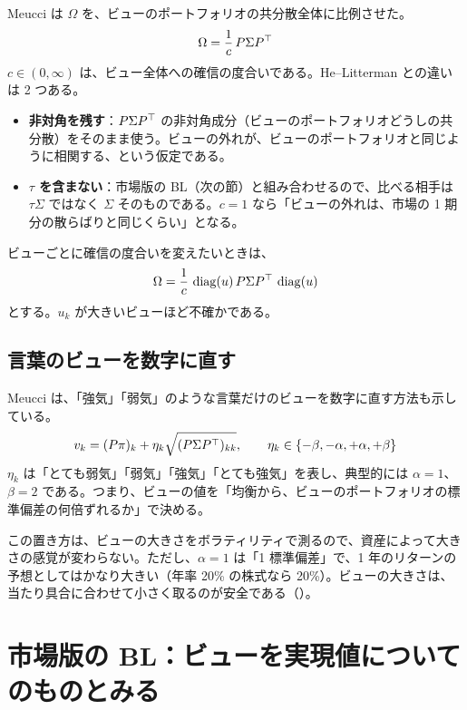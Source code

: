 Meucci は $\Omega$ を、ビューのポートフォリオの共分散全体に比例させた。
\begin{equation}
\Omega=\frac1c\,P\Sigma P^{\top}
\label{eq:meucci-omega}
\end{equation}
$c\in(0,\infty)$ は、ビュー全体への確信の度合いである。He--Litterman との違いは 2 つある。

\begin{itemize}
\item \textbf{非対角を残す}：$P\Sigma P^{\top}$ の非対角成分（ビューのポートフォリオどうしの共分散）をそのまま使う。ビューの外れが、ビューのポートフォリオと同じように相関する、という仮定である。
\item \textbf{$\tau$ を含まない}：市場版の BL（次の節）と組み合わせるので、比べる相手は $\tau\Sigma$ ではなく $\Sigma$ そのものである。$c=1$ なら「ビューの外れは、市場の 1 期分の散らばりと同じくらい」となる。
\end{itemize}

ビューごとに確信の度合いを変えたいときは、
\begin{equation}
\Omega=\frac1c\,\operatorname{diag}(u)\,P\Sigma P^{\top}\,\operatorname{diag}(u)
\label{eq:meucci-u}
\end{equation}
とする。$u_k$ が大きいビューほど不確かである。

\subsection*{言葉のビューを数字に直す}

Meucci は、「強気」「弱気」のような言葉だけのビューを数字に直す方法も示している。
\begin{equation}
v_k=(P\pi)_k+\eta_k\sqrt{(P\Sigma P^{\top})_{kk}},\qquad \eta_k\in\{-\beta,-\alpha,+\alpha,+\beta\}
\label{eq:meucci-eta}
\end{equation}
$\eta_k$ は「とても弱気」「弱気」「強気」「とても強気」を表し、典型的には $\alpha=1$、$\beta=2$ である。つまり、ビューの値を「均衡から、ビューのポートフォリオの標準偏差の何倍ずれるか」で決める。

この置き方は、ビューの大きさをボラティリティで測るので、資産によって大きさの感覚が変わらない。ただし、$\alpha=1$ は「1 標準偏差」で、1 年のリターンの予想としてはかなり大きい（年率 20\% の株式なら 20\%）。ビューの大きさは、当たり具合に合わせて小さく取るのが安全である（）。

\section{市場版の BL：ビューを実現値についてのものとみる}

